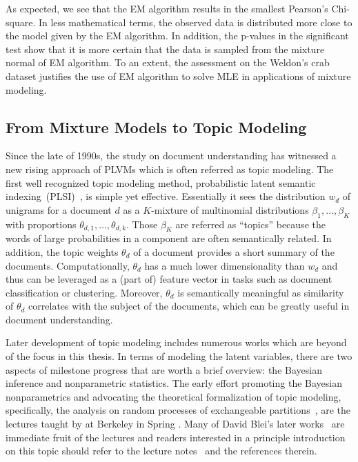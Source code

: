 As expected, we see that the EM algorithm results in the smallest Pearson's
Chi-square. In less mathematical terms, the observed data is distributed more
close to the model given by the EM algorithm. In addition, the p-values in the
significant test show that it is more certain that the data is sampled from the
mixture normal of EM algorithm. To an extent, the assessment on the Weldon's
crab dataset justifies the use of EM algorithm to solve MLE in applications of
mixture modeling.


\subsection{From Mixture Models to Topic Modeling}

Since the late of 1990s, the study on document understanding has witnessed a new
rising approach of PLVMs which is often referred as topic modeling. The first
well recognized topic modeling method, probabilistic latent semantic
indexing~(PLSI)~\cite{hofmann1999probabilistic}, is simple yet effective.
Essentially it sees the distribution $w_d$ of unigrams for a document $d$ as a
$K$-mixture of multinomial distributions $\beta_1, \dots, \beta_K$ with
proportions $\theta_{d, 1}, \dots, \theta_{d, k}$. Those $\beta_K$ are referred
as ``topics'' because the words of large probabilities in a component are often
semantically related. In addition, the topic weights $\theta_d$ of a document
provides a short summary of the documents.  Computationally, $\theta_d$ has a
much lower dimensionality than $w_d$ and thus can be leveraged as a (part of)
feature vector in tasks such as document classification or clustering. Moreover,
$\theta_d$ is semantically meaningful as similarity of $\theta_d$ correlates
with the subject of the documents, which can be greatly useful in document
understanding.

Later development of topic modeling includes numerous works which are beyond of
the focus in this thesis. In terms of modeling the latent variables, there are
two aspects of milestone progress that are worth a brief overview: the Bayesian
inference and nonparametric statistics. The early effort promoting the Bayesian
nonparametrics and advocating the theoretical formalization of topic modeling,
specifically, the analysis on random processes of exchangeable
partitions~\cite{pitman1995exchangeable}, are the lectures taught by
\citeauthor{pitman2002combinatorial} at Berkeley in Spring
\citeyear{pitman2002combinatorial}. Many of David Blei's later
works~\cite{blei2009topic,blei2003latent,blei2010nested} are immediate fruit of
the lectures and readers interested in a principle introduction on this topic
should refer to the lecture notes~\cite{pitman2002combinatorial} and the
references therein.

